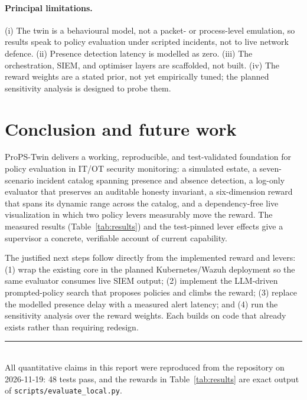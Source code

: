\documentclass[11pt]{article}
\newcommand{\code}[1]{\texttt{\small #1}}
\begin{document}
\paragraph{Principal limitations.} (i) The twin is a behavioural model, not a
packet- or process-level emulation, so results speak to policy evaluation under
scripted incidents, not to live network defence. (ii) Presence detection latency
is modelled as zero. (iii) The orchestration, SIEM, and optimiser layers are
scaffolded, not built. (iv) The reward weights are a stated prior, not yet
empirically tuned; the planned sensitivity analysis is designed to probe them.

\section{Conclusion and future work}
ProPS-Twin delivers a working, reproducible, and test-validated foundation for
policy evaluation in IT/OT security monitoring: a simulated estate, a seven-scenario
incident catalog spanning presence and absence detection, a log-only evaluator
that preserves an auditable honesty invariant, a six-dimension reward that spans
its dynamic range across the catalog, and a dependency-free live visualization in
which two policy levers measurably move the reward. The measured results
(Table~\ref{tab:results}) and the test-pinned lever effects give a supervisor a
concrete, verifiable account of current capability.

The justified next steps follow directly from the implemented reward and levers:
(1) wrap the existing core in the planned Kubernetes/Wazuh deployment so the same
evaluator consumes live SIEM output; (2) implement the LLM-driven prompted-policy
search that proposes policies and climbs the reward; (3) replace the modelled
presence delay with a measured alert latency; and (4) run the sensitivity analysis
over the reward weights. Each builds on code that already exists rather than
requiring redesign.

\vspace{10pt}
\noindent\rule{\linewidth}{0.3pt}\\
{\footnotesize All quantitative claims in this report were reproduced from the
repository on 2026-11-19: 48 tests pass, and the rewards in Table~\ref{tab:results}
are exact output of \code{scripts/evaluate\_local.py}.}
\end{document}
